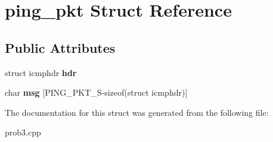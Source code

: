 \hypertarget{structping__pkt}{}\section{ping\+\_\+pkt Struct Reference}
\label{structping__pkt}
\subsection*{Public Attributes}
\begin{DoxyCompactItemize}
\item 
\mbox{\label{structping__pkt_aa7bae735804eb767ae1fc661e5c7c365}} 
struct icmphdr {\bfseries hdr}
\item 
\mbox{\label{structping__pkt_a37344dcd7999496fe651d944a76af026}} 
char {\bfseries msg} \mbox{[}P\+I\+N\+G\+\_\+\+P\+K\+T\+\_\+S-\/sizeof(struct icmphdr)\mbox{]}
\end{DoxyCompactItemize}


The documentation for this struct was generated from the following file\+:\begin{DoxyCompactItemize}
\item 
prob3.\+cpp\end{DoxyCompactItemize}
